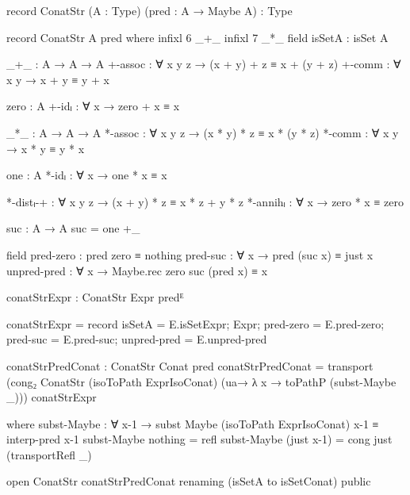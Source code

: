\begin{code}
record ConatStr (A : Type) (pred : A → Maybe A) : Type
\end{code}
\begin{code}[hide]
record ConatStr A pred where
  infixl 6 _+_
  infixl 7 _*_
  field
    isSetA : isSet A

    _+_ : A → A → A
    +-assoc : ∀ x y z → (x + y) + z ≡ x + (y + z)
    +-comm : ∀ x y → x + y ≡ y + x

    zero : A
    +-idₗ : ∀ x → zero + x ≡ x

    _*_ : A → A → A
    *-assoc : ∀ x y z → (x * y) * z ≡ x * (y * z)
    *-comm : ∀ x y → x * y ≡ y * x

    one : A
    *-idₗ : ∀ x → one * x ≡ x

    *-distₗ-+ : ∀ x y z → (x + y) * z ≡ x * z + y * z
    *-annihₗ : ∀ x → zero * x ≡ zero

  suc : A → A
  suc = one +_
\end{code}
\begin{code}
  field
    pred-zero : pred zero ≡ nothing
    pred-suc : ∀ x → pred (suc x) ≡ just x
    unpred-pred : ∀ x → Maybe.rec zero suc (pred x) ≡ x

conatStrExpr : ConatStr Expr predᴱ
\end{code}
\begin{code}[hide]
conatStrExpr =
  record
    { isSetA = E.isSetExpr;
      Expr;
      pred-zero = E.pred-zero;
      pred-suc = E.pred-suc;
      unpred-pred = E.unpred-pred }
\end{code}
\begin{code}
conatStrPredConat : ConatStr Conat pred
conatStrPredConat =
  transport
    (cong₂ ConatStr
      (isoToPath ExprIsoConat)
      (ua→ λ x → toPathP (subst-Maybe _)))
    conatStrExpr
\end{code}
\begin{code}[hide]
  where
  subst-Maybe :
    ∀ x-1 → subst Maybe (isoToPath ExprIsoConat) x-1 ≡ interp-pred x-1
  subst-Maybe nothing = refl
  subst-Maybe (just x-1) = cong just (transportRefl _)

open ConatStr conatStrPredConat renaming (isSetA to isSetConat) public
\end{code}

